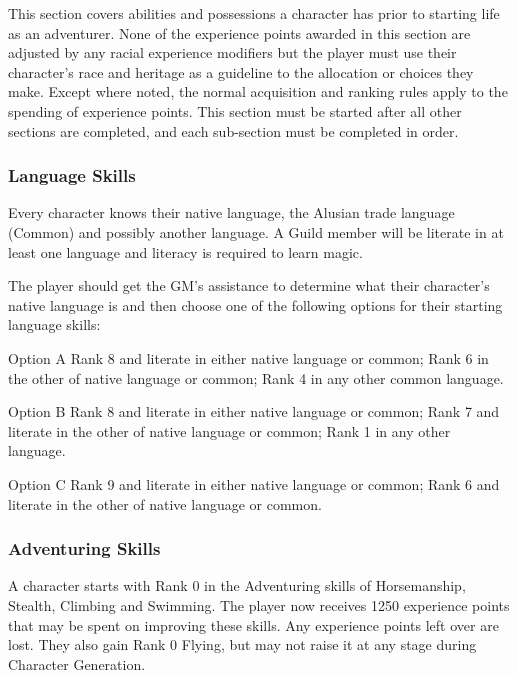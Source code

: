 \begin{multicols*}{3}
This section covers abilities and possessions a character has prior to
starting life as an adventurer. None of the experience points awarded
in this section are adjusted by any racial experience modifiers but
the player must use their character's race and heritage as a guideline
to the allocation or choices they make. Except where noted, the normal
acquisition and ranking rules apply to the spending of experience
points. This section must be started after all other sections are
completed, and each sub-section must be completed in order.

\subsubsection{Language Skills}

Every character knows their native language, the Alusian trade
language (Common) and possibly another language. A Guild member will
be literate in at least one language and literacy is required to learn
magic.

The player should get the GM's assistance to determine what their
character's native language is and then choose one of the following
options for their starting language skills:

\begin{Description}
\item[Option A] Rank 8 and literate in either native language or
common; Rank 6 in the other of native language or common; Rank 4 in
any other common language.

\item[Option B] Rank 8 and literate in either native language or
common; Rank 7 and literate in the other of native language or common;
Rank 1 in any other language.

\item[Option C] Rank 9 and literate in either native language or
common; Rank 6 and literate in the other of native language or common.
\end{Description}

\subsubsection{Adventuring Skills}

A character starts with Rank 0 in the Adventuring skills of
Horsemanship, Stealth, Climbing and Swimming. The player now receives
1250 experience points that may be spent on improving these
skills. Any experience points left over are lost. They also gain Rank
0 Flying, but may not raise it at any stage during Character
Generation.


\end{multicols*}

